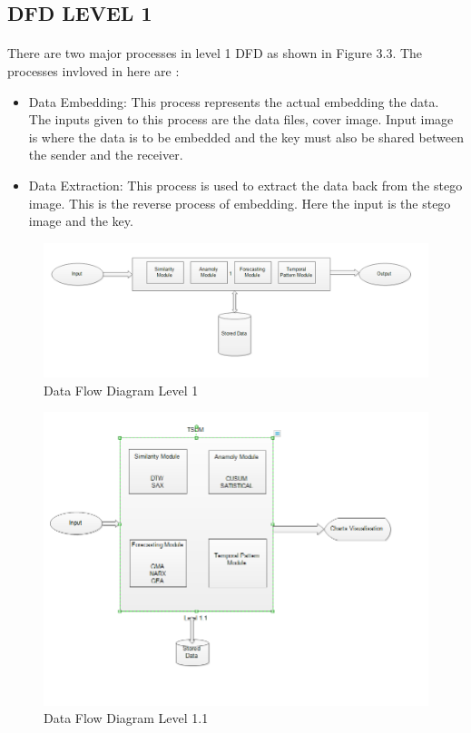 \documentclass[12pt]{report}
\begin{document}
\subsection{DFD LEVEL 1}
\paragraph{}There are two major processes in level 1 DFD as shown in Figure 3.3. The processes invloved in here are :

\begin{itemize}
\item Data Embedding: This process represents the actual embedding the data. The inputs given to this process are the data files, cover image. Input image is where the data is to be embedded and the key must also be shared between the sender and the receiver.
\item Data Extraction: This process is used to extract the data back from the stego image. This is the reverse process of embedding. Here the input is the stego image and the key.
\end{itemize}
\begin{figure}[h!]
	\centering
		\includegraphics[scale=0.65]{screenshots/dfd_1.png}
		\caption{Data Flow Diagram Level 1}
\end{figure}
\begin{figure}[h!]
	\centering
		\includegraphics[scale=0.8]{screenshots/dfd_1_1.png}
		\caption{Data Flow Diagram Level 1.1}
\end{figure}
\end{document}
